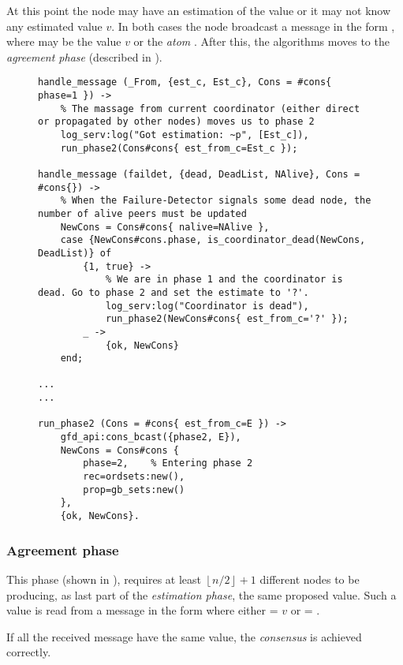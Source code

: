 At this point the node may have an estimation of the value or it may not
know any estimated value $v$. In both cases the node broadcast a message
in the form , where  may be the value $v$ or
the \emph{atom} . After this, the algorithms moves to the
\emph{agreement phase} (described in ).

\begin{figure}[tb!]
\begin{lstlisting}[caption={Estimation phase},
                   label={code:ConsEstimation}]
handle_message (_From, {est_c, Est_c}, Cons = #cons{ phase=1 }) ->
    % The massage from current coordinator (either direct or propagated by other nodes) moves us to phase 2
    log_serv:log("Got estimation: ~p", [Est_c]),
    run_phase2(Cons#cons{ est_from_c=Est_c });

handle_message (faildet, {dead, DeadList, NAlive}, Cons = #cons{}) ->
    % When the Failure-Detector signals some dead node, the number of alive peers must be updated
    NewCons = Cons#cons{ nalive=NAlive },
    case {NewCons#cons.phase, is_coordinator_dead(NewCons, DeadList)} of
        {1, true} ->
            % We are in phase 1 and the coordinator is dead. Go to phase 2 and set the estimate to '?'.
            log_serv:log("Coordinator is dead"),
            run_phase2(NewCons#cons{ est_from_c='?' });
        _ ->
            {ok, NewCons}
    end;

...
...

run_phase2 (Cons = #cons{ est_from_c=E }) ->
    gfd_api:cons_bcast({phase2, E}),
    NewCons = Cons#cons {
        phase=2,    % Entering phase 2
        rec=ordsets:new(),
        prop=gb_sets:new()
    },
    {ok, NewCons}.
\end{lstlisting}
\end{figure}

\subsubsection{Agreement phase} \label{subsub:ConsAgreement}

This phase (shown in ), requires at least
$\left\lfloor n/2 \right\rfloor + 1$ different nodes to be producing, as
last part of the \emph{estimation phase}, the same proposed value. Such a
value is read from a message in the form  where
either  = $v$ or  = .

If all the received message have the same value, the \emph{consensus} is
achieved correctly.

